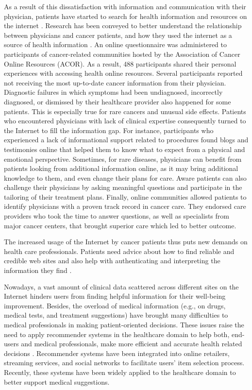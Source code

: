 As a result of this dissatisfaction with information and communication with their physician, patients have started to search for health information and resources on the internet \cite{chen_impact_2001,pereira_internet_2000,ziebland_how_2004,dolce_internet_2011}. Research has been conveyed to better understand the relationship between physicians and cancer patients, and how they used the internet as a source of health information \cite{dolce_internet_2011}. An online questionnaire was administered to participants of cancer-related communities hosted by the Association of Cancer Online Resources (ACOR). As a result, 488 participants shared their personal experiences with accessing health online resources. Several participants reported not receiving the most up-to-date cancer information from their physician. Diagnostic failures in which symptoms had been undiagnosed, incorrectly diagnosed, or dismissed by their healthcare provider also happened for some patients. This is especially true for rare cancers and unusual side effects. Patients who encountered physicians with lack of clinical expertise consequently turned to the Internet to fill the information gap. For instance, participants who experienced a lack of informational support related to procedures found blogs and testimonies online that helped them to know what to expect from a physical and emotional perspective. Sometimes, for rare diseases, physicians can benefit from patients looking from additional information online, as it may bring additional knowledge to them, and even change their plans for care. Aware patients can also challenge their physicians by asking meaningful questions and participate in the tailoring of their treatment plans. Finally, online communities allowed patients to identify physicians with a proven track record in cancer care. They endorsed care providers who took the time to answer questions, as well as specialists from major cancer centers, that brought superior care which led to better outcome.

The increased usage of the Internet by cancer patients thus puts new demands on health care professionals. Patients need advice about how to find reliable and credible web sites and also help with authenticating and interpreting the information they find \cite{carlsson_cancer_2009}.

Nowadays, a vast amount of clinical data scattered across different sites on the Internet hinders users from finding helpful information for their well-being improvement. Besides, the overload of medical information (e.g., on drugs, medical tests, and treatment suggestions) have brought many difficulties to medical professionals in making patient-oriented decisions. These issues raise the need to apply recommender systems in the healthcare domain to help both, end-users and medical professionals, make more efficient and accurate health related decisions \cite{tran_recommender_2021}. Recommender systems have been integrated into online retailers, streaming services, and social networks to facilitate users' item selection process. Recently, these systems have been widely applied to the healthcare domain to better support medical suggestions.

